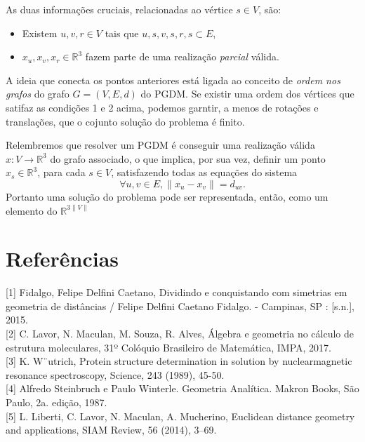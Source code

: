 \documentclass[a4paper,12pt]{article}
\begin{document}
	As duas informações cruciais, relacionadas ao vértice $s\in V$, são:
	\begin{itemize}
		\item Existem $u, v, r \in V$ tais que ${u, s}, {v, s}, {r, s}\subset E$,
		\item $x_{u}, x_{v}, x_{r} \in\mathbb{R}^{3}$ fazem parte de uma realização \textit{parcial} válida. 
	\end{itemize}
	
	A ideia que conecta os pontos anteriores está ligada ao conceito de \textit{ordem nos grafos} do grafo $G = (V, E, d)$ do PGDM. Se existir uma ordem dos vértices que satifaz as condições 1 e 2 acima, podemos garntir, a menos de rotações e translações, que o cojunto solução do problema é finito.
	
	Relembremos que resolver um PGDM é conseguir uma realização válida $x: V \rightarrow\mathbb{R}^{3}$ do grafo associado, o que implica, por sua vez, definir um ponto $x_{s}\in\mathbb{R}^3$, para cada $s\in V$, satisfazendo todas as equações do sistema
	$$
	\forall {u, v}\in E, \|x_{u} - x_{v}\| = d_{uv}.
	$$
	Portanto uma solução do problema pode ser representada, então, como um elemento do $\mathbb{R}^{3\|V\|}$
	\\
	\newpage
	\section*{Referências}
	[1]  Fidalgo, Felipe Delfini Caetano, Dividindo e conquistando com simetrias em geometria de distâncias / Felipe Delfini Caetano Fidalgo. - Campinas, SP : [s.n.], 2015.
	\\
	
	[2]  C. Lavor, N. Maculan, M. Souza, R. Alves, Álgebra e geometria no cálculo de estrutura moleculares, 31º Colóquio Brasileiro de Matemática, IMPA, 2017.
	\\
	
	[3] K. W¨utrich, Protein structure determination in solution by nuclearmagnetic resonance spectroscopy, Science, 243 (1989), 45-50.
	\\
	
	[4]  Alfredo Steinbruch e Paulo Winterle. Geometria Analítica. Makron Books, São Paulo, 2a. edição, 1987.
	\\
	
	[5] L. Liberti, C. Lavor, N. Maculan, A. Mucherino, Euclidean distance geometry and applications, SIAM Review, 56 (2014), 3–69.
	\\
	
\end{document}
